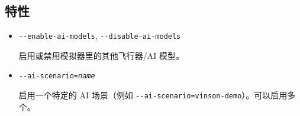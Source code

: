 \ifchinese
{
  \subsection{特性}
\begin{itemize}

\item{\texttt{-$ $-enable-ai-models}, \texttt{-$ $-disable-ai-models}}
 
  启用或禁用模拟器里的其他飞行器/AI 模型。

\item{\texttt{-$ $-ai-scenario={\it name}}}

  启用一个特定的 AI 场景（例如 \texttt{-$ $-ai-scenario=vinson-demo}）。可以启用多个。

\end{itemize}
}
\fi






